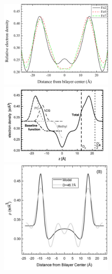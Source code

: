 
\begin{figure}[htbp]
  \centering
  \includegraphics[width=0.5\textwidth]{figures/ripple/discussion/minor_edp}
  \includegraphics[width=0.5\textwidth]{figures/ripple/discussion/Kucerka_fluid_DMPC}
  \includegraphics[width=0.5\textwidth]{figures/ripple/discussion/Guler_interdigitated_DHPC}

\end{figure}
